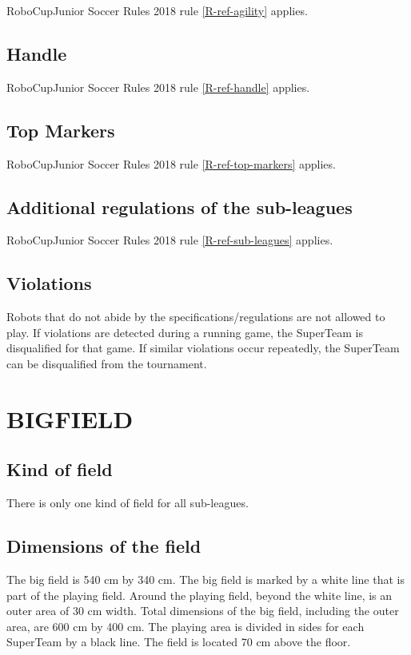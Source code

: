 \documentclass{article}
\begin{document}
RoboCupJunior Soccer Rules 2018 rule \ref{R-ref-agility} applies.


\subsection{ Handle \label{ref-024}}


RoboCupJunior Soccer Rules 2018 rule \ref{R-ref-handle} applies.

\subsection{ Top Markers\label{ref-025}}


RoboCupJunior Soccer Rules 2018 rule \ref{R-ref-top-markers} applies.


\subsection{ Additional regulations of the sub-leagues \label{ref-026}}

RoboCupJunior Soccer Rules 2018 rule \ref{R-ref-sub-leagues} applies.

\subsection{ Violations \label{ref-027}}

Robots that do not abide by the specifications/regulations are not allowed to
play. If violations are detected during a running game, the SuperTeam is
disqualified for that game. If similar violations occur repeatedly, the
SuperTeam can be disqualified from the tournament.

\section{BIGFIELD \label{ref-028}}

\subsection{Kind of field \label{ref-029}}

There is only one kind of field for all sub-leagues.

\subsection{ Dimensions of the field \label{ref-030}}

The big field is 540 cm by 340 cm. The big field is marked by a white line that
is part of the playing field. Around the playing field, beyond the white line,
is an outer area of 30 cm width. Total dimensions of the big field, including
the outer area, are 600 cm by 400 cm. The playing area is divided in sides for
each SuperTeam by a black line. The field is located 70 cm above the floor.
\end{document}
